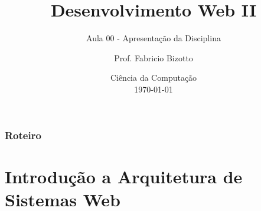 \documentclass[
	10pt, %
	t, %
]{beamer}
\title[DesWebII]{Desenvolvimento Web II} %
\subtitle{Aula 00 - Apresentação da Disciplina} %
\author[Fabricio Bizotto]{Prof. Fabricio Bizotto} %
\institute[IFC]{Instituto Federal Catarinense \\ \smallskip \textit{fabricio.bizotto@ifc.edu.br}} %
\date[\today]{Ciência da Computação \\ \today} %
\begin{document}

\begin{frame}
	\titlepage %
\end{frame}


\begin{frame}
	\frametitle{Roteiro} %
	
	\tableofcontents %
\end{frame}


\section{Introdução a Arquitetura de Sistemas Web} %
\end{document}
